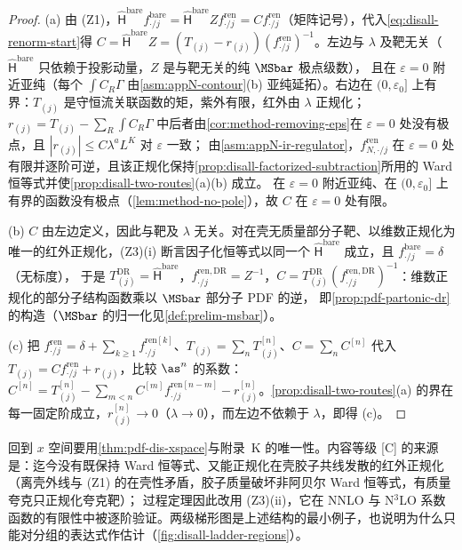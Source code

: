 \begin{proof}
(a) 由 (Z1)，$\hat{\mathsf H}^{\mathrm{bare}}f^{\mathrm{bare}}_{\cdot/j}=\hat{\mathsf H}^{\mathrm{bare}}Zf^{\mathrm{ren}}_{\cdot/j}=Cf^{\mathrm{ren}}_{\cdot/j}$（矩阵记号），代入\cref{eq:disall-renorm-start}得
$C=\hat{\mathsf H}^{\mathrm{bare}}Z=(T_{(j)}-r_{(j)})(f^{\mathrm{ren}}_{\cdot/j})^{-1}$。左边与 $\lambda$ 及靶无关（$\hat{\mathsf H}^{\mathrm{bare}}$ 只依赖于投影动量，$Z$ 是与靶无关的纯 $\MSbar$ 极点级数），
且在 $\varepsilon=0$ 附近亚纯（每个 $\int C_R\Gamma$ 由\cref{asm:appN-contour}(b) 亚纯延拓）。右边在 $(0,\varepsilon_0]$ 上有界：$T_{(j)}$ 是守恒流关联函数的矩，紫外有限，红外由 $\lambda$ 正规化；
$r_{(j)}=T_{(j)}-\sum_R\int C_R\Gamma$ 中后者由\cref{cor:method-removing-eps}在 $\varepsilon=0$ 处没有极点，且 $|r_{(j)}|\le C\lambda^aL^K$ 对 $\varepsilon$ 一致；
由\cref{asm:appN-ir-regulator}，$f^{\mathrm{ren}}_{N,\cdot/j}$ 在 $\varepsilon=0$ 处有限并逐阶可逆，且该正规化保持\cref{prop:disall-factorized-subtraction}所用的 Ward 恒等式并使\cref{prop:disall-two-routes}(a)(b) 成立。
在 $\varepsilon=0$ 附近亚纯、在 $(0,\varepsilon_0]$ 上有界的函数没有极点（\cref{lem:method-no-pole}），故 $C$ 在 $\varepsilon=0$ 处有限。

(b) $C$ 由左边定义，因此与靶及 $\lambda$ 无关。对在壳无质量部分子靶、以维数正规化为唯一的红外正规化，(Z3)(i) 断言因子化恒等式以同一个 $\hat{\mathsf H}^{\mathrm{bare}}$ 成立，且 $f^{\mathrm{bare}}_{\cdot/j}=\delta$（无标度），
于是 $T^{\mathrm{DR}}_{(j)}=\hat{\mathsf H}^{\mathrm{bare}}$，$f^{\mathrm{ren,DR}}_{\cdot/j}=Z^{-1}$，$C=T^{\mathrm{DR}}_{(j)}(f^{\mathrm{ren,DR}}_{\cdot/j})^{-1}$：维数正规化的部分子结构函数乘以 $\MSbar$ 部分子 PDF 的逆，
即\cref{prop:pdf-partonic-dr}的构造（$\MSbar$ 的归一化见\cref{def:prelim-msbar}）。

(c) 把 $f^{\mathrm{ren}}_{\cdot/j}=\delta+\sum_{k\ge1}f^{\mathrm{ren}[k]}_{\cdot/j}$、$T_{(j)}=\sum_nT^{[n]}_{(j)}$、$C=\sum_nC^{[n]}$ 代入 $T_{(j)}=Cf^{\mathrm{ren}}_{\cdot/j}+r_{(j)}$，比较 $\as^n$ 的系数：
$C^{[n]}=T^{[n]}_{(j)}-\sum_{m<n}C^{[m]}f^{\mathrm{ren}[n-m]}_{\cdot/j}-r^{[n]}_{(j)}$。\cref{prop:disall-two-routes}(a) 的界在每一固定阶成立，$r^{[n]}_{(j)}\to0$（$\lambda\to0$），而左边不依赖于 $\lambda$，即得 (c)。
\end{proof}

\noindent
回到 $x$ 空间要用\cref{thm:pdf-dis-xspace}与附录~K 的唯一性。内容等级 [C] 的来源是：迄今没有既保持 Ward 恒等式、又能正规化在壳胶子共线发散的红外正规化（离壳外线与 (Z1) 的在壳性矛盾，胶子质量破坏非阿贝尔 Ward 恒等式，有质量夸克只正规化夸克靶）；
过程定理因此改用 (Z3)(ii)，它在 NNLO 与 N$^3$LO 系数函数的有限性中被逐阶验证。两级梯形图是上述结构的最小例子，也说明为什么只能对分组的表达式作估计（\cref{fig:disall-ladder-regions}）。

